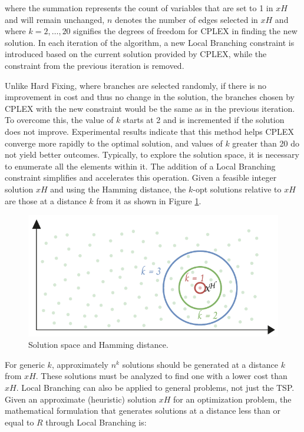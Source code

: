 where the summation represents the count of variables that are set to 1 in \(xH\) and will remain unchanged, \(n\) denotes the number of edges selected in \(xH\) and where \(k = 2, \ldots, 20\) signifies the degrees of freedom for CPLEX in finding the new solution. In each iteration of the algorithm, a new Local Branching constraint is introduced based on the current solution provided by CPLEX, while the constraint from the previous iteration is removed.

Unlike Hard Fixing, where branches are selected randomly, if there is no improvement in cost and thus no change in the solution, the branches chosen by CPLEX with the new constraint would be the same as in the previous iteration. To overcome this, the value of \(k\) starts at 2 and is incremented if the solution does not improve.
Experimental results indicate that this method helps CPLEX converge more rapidly to the optimal solution, and values of \(k\) greater than 20 do not yield better outcomes. Typically, to explore the solution space, it is necessary to enumerate all the elements within it. The addition of a Local Branching constraint simplifies and accelerates this operation.
Given a feasible integer solution \(xH\) and using the Hamming distance, the \(k\)-opt solutions relative to \(xH\) are those at a distance \(k\) from it as shown in Figure \ref{fig:soft_fix}.

\begin{figure}[H]
    \centering
    \includegraphics[width=0.8\linewidth]{Immagini/soft_fix.pdf}
    \caption{Solution space and Hamming distance.}
    \label{fig:soft_fix}
\end{figure}

For generic \(k\), approximately \(n^k\) solutions should be generated at a distance \(k\) from \(xH\). These solutions must be analyzed to find one with a lower cost than \(xH\).
Local Branching can also be applied to general problems, not just the TSP. Given an approximate (heuristic) solution \(xH\) for an optimization problem, the mathematical formulation that generates solutions at a distance less than or equal to \(R\) through Local Branching is:

